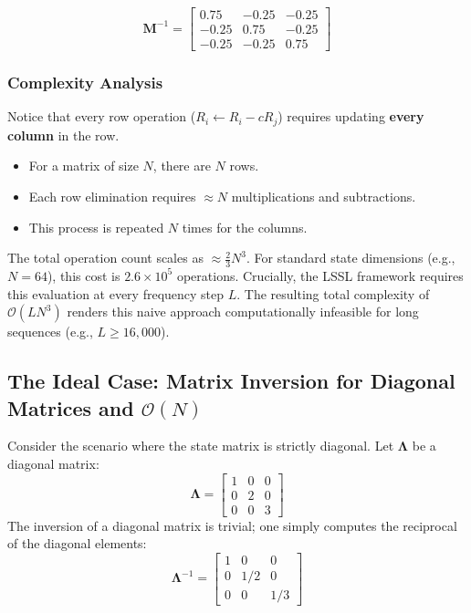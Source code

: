 \documentclass[a4paper,11pt]{article}
\begin{document}
\begin{equation}
    \mathbf{M}^{-1} = \begin{bmatrix}
    0.75 & -0.25 & -0.25 \\
    -0.25 & 0.75 & -0.25 \\
    -0.25 & -0.25 & 0.75
    \end{bmatrix}
\end{equation}

\subsubsection{Complexity Analysis}
Notice that every row operation ($R_i \leftarrow R_i - c R_j$) requires updating \textbf{every column} in the row.
\begin{itemize}
    \item For a matrix of size $N$, there are $N$ rows.
    \item Each row elimination requires $\approx N$ multiplications and subtractions.
    \item This process is repeated $N$ times for the columns.
\end{itemize}
The total operation count scales as $\approx \frac{2}{3}N^3$. For standard state dimensions (e.g., $N=64$), this cost is $2.6 \times 10^5$ operations. Crucially, the LSSL framework requires this evaluation at every frequency step $L$. The resulting total complexity of $\mathcal{O}(LN^3)$ renders this naive approach computationally infeasible for long sequences (e.g., $L \geq 16,000$).





\subsection{The Ideal Case: Matrix Inversion for Diagonal Matrices and \texorpdfstring{$\mathcal{O}(N)$}{O(N)}}
\label{sec:ideal_case}

Consider the scenario where the state matrix is strictly diagonal. Let $\mathbf{\Lambda}$ be a diagonal matrix:
\begin{equation} \label{eq:diagonal_matrix}
    \mathbf{\Lambda} = \begin{bmatrix}
    1 & 0 & 0 \\
    0 & 2 & 0 \\
    0 & 0 & 3
    \end{bmatrix}
\end{equation}
The inversion of a diagonal matrix is trivial; one simply computes the reciprocal of the diagonal elements:
\begin{equation} \label{eq:diagonal_inverse}
    \mathbf{\Lambda}^{-1} = \begin{bmatrix}
    1 & 0 & 0 \\
    0 & 1/2 & 0 \\
    0 & 0 & 1/3
    \end{bmatrix}
\end{equation}
\end{document}
